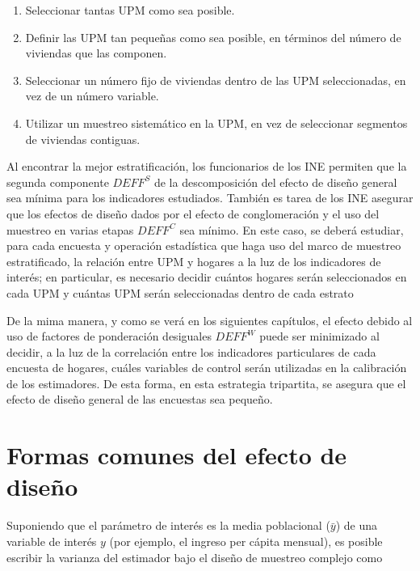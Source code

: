 \documentclass[
  12pt,
  spanish,
]{book}
\providecommand{\tightlist}{%
  \setlength{\itemsep}{0pt}\setlength{\parskip}{0pt}}
\begin{document}
\begin{enumerate}
\def\labelenumi{\arabic{enumi}.}
\tightlist
\item
  Seleccionar tantas UPM como sea posible.
\item
  Definir las UPM tan pequeñas como sea posible, en términos del número de viviendas que las componen.
\item
  Seleccionar un número fijo de viviendas dentro de las UPM seleccionadas, en vez de un número variable.
\item
  Utilizar un muestreo sistemático en la UPM, en vez de seleccionar segmentos de viviendas contiguas.
\end{enumerate}

Al encontrar la mejor estratificación, los funcionarios de los INE permiten que la segunda componente \(DEFF^S\) de la descomposición del efecto de diseño general sea mínima para los indicadores estudiados. También es tarea de los INE asegurar que los efectos de diseño dados por el efecto de conglomeración y el uso del muestreo en varias etapas \(DEFF^C\) sea mínimo. En este caso, se deberá estudiar, para cada encuesta y operación estadística que haga uso del marco de muestreo estratificado, la relación entre UPM y hogares a la luz de los indicadores de interés; en particular, es necesario decidir cuántos hogares serán seleccionados en cada UPM y cuántas UPM serán seleccionadas dentro de cada estrato

De la mima manera, y como se verá en los siguientes capítulos, el efecto debido al uso de factores de ponderación desiguales \(DEFF^W\) puede ser minimizado al decidir, a la luz de la correlación entre los indicadores particulares de cada encuesta de hogares, cuáles variables de control serán utilizadas en la calibración de los estimadores. De esta forma, en esta estrategia tripartita, se asegura que el efecto de diseño general de las encuestas sea pequeño.

\hypertarget{formas-comunes-del-efecto-de-diseuxf1o}{%
\section{Formas comunes del efecto de diseño}\label{formas-comunes-del-efecto-de-diseuxf1o}}

Suponiendo que el parámetro de interés es la media poblacional (\(\bar{y}\)) de una variable de interés \(y\) (por ejemplo, el ingreso per cápita mensual), es posible escribir la varianza del estimador bajo el diseño de muestreo complejo como
\end{document}
